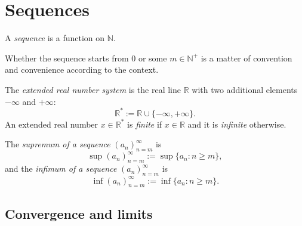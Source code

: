 
\section{Sequences}
\label{sec:sequences}

\begin{defn}
  A \emph{sequence} is a function on $\mathbb{N}$.
\end{defn}

\begin{rem}
  Whether the sequence starts from 0 or some $m\in \mathbb{N}^+$
   is a matter of convention and convenience
   according to the context.
\end{rem}

\begin{defn}
  The \emph{extended real number system}
  is the real line $\mathbb{R}$ with two additional elements
  $-\infty$ and $+\infty$: 
  \begin{equation}
    \label{eq:extendedReals}
    \mathbb{R}^* := \mathbb{R} \cup \{-\infty, + \infty\}.
  \end{equation}
  An extended real number $x\in \mathbb{R}^*$
  is \emph{finite} if $x\in \mathbb{R}$
  and it is \emph{infinite} otherwise.
\end{defn}

\begin{defn}
  The \emph{supremum of a sequence} $(a_n)_{n=m}^{\infty}$ is
  \begin{equation}
    \label{eq:supSequence}
    \sup(a_n)_{n=m}^{\infty}
    := \sup \{a_n: n\ge m\},
  \end{equation}
  and the \emph{infimum of a sequence} $(a_n)_{n=m}^{\infty}$ is 
  \begin{equation}
    \label{eq:infSequence}
    \inf(a_n)_{n=m}^{\infty}
    := \inf \{a_n: n\ge m\}.
  \end{equation}
\end{defn}


\subsection{Convergence and limits}
\label{sec:convergenceOfSequence}

